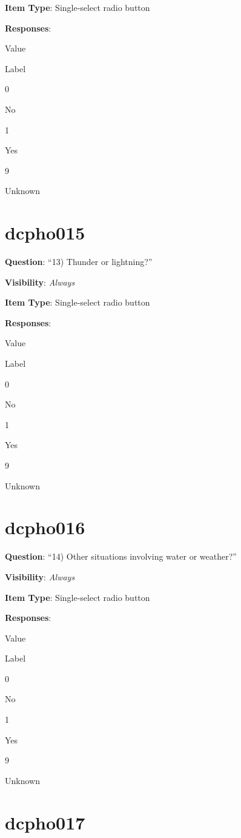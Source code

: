 \documentclass[]{book}
\begin{document}
\textbf{Item Type}: Single-select radio button

\textbf{Responses}:

Value

Label

0

No

1

Yes

9

Unknown

\hypertarget{dcpho015}{%
\section{dcpho015}\label{dcpho015}}

\textbf{Question}: ``13) Thunder or lightning?''

\textbf{Visibility}: \emph{Always}

\textbf{Item Type}: Single-select radio button

\textbf{Responses}:

Value

Label

0

No

1

Yes

9

Unknown

\hypertarget{dcpho016}{%
\section{dcpho016}\label{dcpho016}}

\textbf{Question}: ``14) Other situations involving water or weather?''

\textbf{Visibility}: \emph{Always}

\textbf{Item Type}: Single-select radio button

\textbf{Responses}:

Value

Label

0

No

1

Yes

9

Unknown

\hypertarget{dcpho017}{%
\section{dcpho017}\label{dcpho017}}
\end{document}
